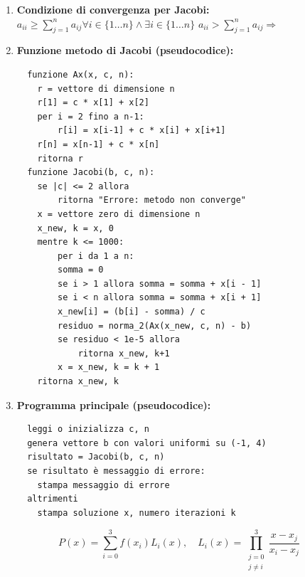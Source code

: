 \documentclass[12pt,a4paper]{article}
\begin{document}
\begin{enumerate}
  \item \textbf{Condizione di convergenza per Jacobi:} $a_{ii}\geq\sum_{j=1}^na_{ij}\forall i \in \{1 \dots n \} \land \exists i \in \{1 \dots n \}$ $a_{ii}>\sum_{j=1}^na_{ij}\Rightarrow $

  \item \textbf{Funzione metodo di Jacobi (pseudocodice):}
\begin{verbatim}
  funzione Ax(x, c, n):
    r = vettore di dimensione n
    r[1] = c * x[1] + x[2]
    per i = 2 fino a n-1:
        r[i] = x[i-1] + c * x[i] + x[i+1]
    r[n] = x[n-1] + c * x[n]
    ritorna r
  funzione Jacobi(b, c, n):
    se |c| <= 2 allora
        ritorna "Errore: metodo non converge"
    x = vettore zero di dimensione n
    x_new, k = x, 0
    mentre k <= 1000:
        per i da 1 a n:
        somma = 0
        se i > 1 allora somma = somma + x[i - 1]
        se i < n allora somma = somma + x[i + 1]
        x_new[i] = (b[i] - somma) / c
        residuo = norma_2(Ax(x_new, c, n) - b)
        se residuo < 1e-5 allora
            ritorna x_new, k+1
        x = x_new, k = k + 1
    ritorna x_new, k
  \end{verbatim}
  \item \textbf{Programma principale (pseudocodice):}
  \begin{verbatim}
  leggi o inizializza c, n
  genera vettore b con valori uniformi su (-1, 4)
  risultato = Jacobi(b, c, n)
  se risultato è messaggio di errore:
    stampa messaggio di errore
  altrimenti
    stampa soluzione x, numero iterazioni k
  \end{verbatim}
\end{enumerate}

\newpage
\noindent
{}

\vspace{1em}
\noindent

\[
P(x) = \sum_{i=0}^3 f(x_i) L_i(x), \quad L_i(x) = \prod_{\substack{j=0 \\ j \neq i}}^3 \frac{x - x_j}{x_i - x_j}
\]
\end{document}
